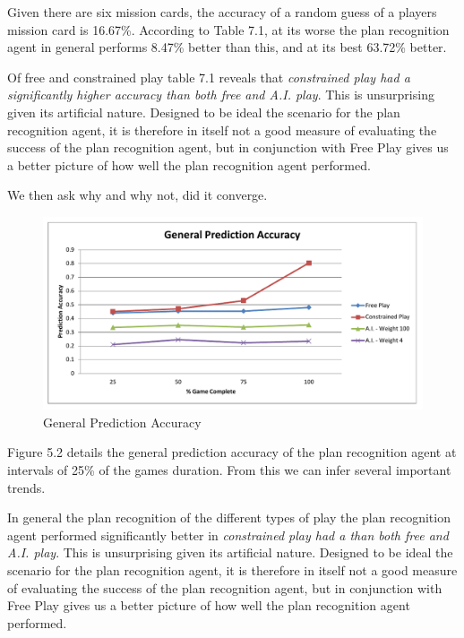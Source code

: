 \documentclass[parskip]{cs4rep}
\begin{document}
Given there are six mission cards, the accuracy of a random guess of a players mission card is 16.67\%. According to Table 7.1, at its worse the plan recognition agent in general performs 8.47\% better than this, and at its best 63.72\% better. 

Of free and constrained play table 7.1 reveals that \textit{constrained play had a significantly higher accuracy than both free and A.I. play}. This is unsurprising given its artificial nature. Designed to be ideal the scenario for the plan recognition agent, it is therefore in itself not a good measure of evaluating the success of the plan recognition agent, but in conjunction with Free Play gives us a better picture of how well the plan recognition agent performed.

We then ask why and why not, did it converge.

\begin{figure}[h]
\centerline{
\includegraphics[width=\textwidth]{images/general-graph.pdf}
}
\caption{General Prediction Accuracy}
\label{fig:dom-debug-gui}
\end{figure} 

Figure 5.2 details the general prediction accuracy of the plan recognition agent at intervals of 25\% of the games duration. From this we can infer several important trends.

In general the plan recognition of the different types of play the plan recognition agent performed significantly better in \textit{constrained play had a than both free and A.I. play}. This is unsurprising given its artificial nature. Designed to be ideal the scenario for the plan recognition agent, it is therefore in itself not a good measure of evaluating the success of the plan recognition agent, but in conjunction with Free Play gives us a better picture of how well the plan recognition agent performed.
\end{document}
